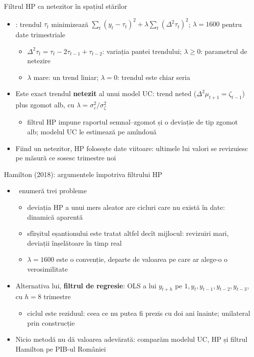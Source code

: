\begin{frame}{Filtrul HP ca netezitor în spațiul stărilor}
\itemsize{\small}
\begin{itemize}
    \item {}: trendul $\tau_t$ minimizează $\sum_t(y_t - \tau_t)^2 + \lambda\sum_t(\Delta^2\tau_t)^2$; $\lambda = 1600$ pentru date trimestriale
    \begin{itemize}
        \item $\Delta^2\tau_t = \tau_t - 2\tau_{t-1} + \tau_{t-2}$: variația pantei trendului; $\lambda \ge 0$: parametrul de netezire
        \item $\lambda$ mare: un trend liniar; $\lambda = 0$: trendul este chiar seria
    \end{itemize}
    \item Este exact trendul \textbf{netezit} al unui model UC: trend neted ($\Delta^2\mu_{t+1} = \zeta_{t-1}$) plus zgomot alb, cu $\lambda = \sigma^2_\varepsilon/\sigma^2_\zeta$ 
    \begin{itemize}
        \item filtrul HP impune raportul semnal--zgomot și o deviație de tip zgomot alb; modelul UC le estimează pe amîndouă
    \end{itemize}
    \item Fiind un netezitor, HP folosește date viitoare: ultimele lui valori se revizuiesc pe măsură ce sosesc trimestre noi
\end{itemize}
\end{frame}

\begin{frame}{Hamilton (2018): argumentele împotriva filtrului HP}
\itemsize{\small}
\begin{itemize}
    \item {}\ enumeră trei probleme
    \begin{itemize}
        \item deviația HP a unui mers aleator are cicluri care nu există în date: dinamică aparentă
        \item sfîrșitul eșantionului este tratat altfel decît mijlocul: revizuiri mari, deviații înșelătoare în timp real
        \item $\lambda = 1600$ este o convenție, departe de valoarea pe care ar alege-o o verosimilitate
    \end{itemize}
    \item Alternativa lui, \textbf{filtrul de regresie}: OLS a lui $y_{t+h}$ pe $1, y_t, y_{t-1}, y_{t-2}, y_{t-3}$, cu $h = 8$ trimestre
    \begin{itemize}
        \item ciclul este reziduul: ceea ce nu putea fi prezis cu doi ani înainte; unilateral prin construcție
    \end{itemize}
    \item Nicio metodă nu dă valoarea adevărată: comparăm modelul UC, HP și filtrul Hamilton pe PIB-ul României
\end{itemize}
\end{frame}

